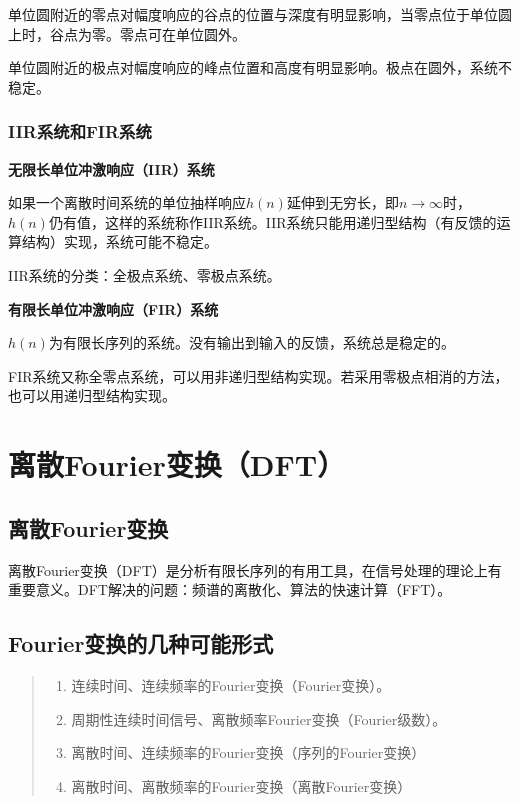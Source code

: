 \documentclass[cn, hazy, blue, normal, 12pt]{elegantnote}
\begin{document}
单位圆附近的零点对幅度响应的谷点的位置与深度有明显影响，当零点位于单位圆上时，谷点为零。零点可在单位圆外。

单位圆附近的极点对幅度响应的峰点位置和高度有明显影响。极点在圆外，系统不稳定。

\subsubsection{IIR系统和FIR系统}

\textbf{无限长单位冲激响应（IIR）系统}

如果一个离散时间系统的单位抽样响应$h(n)$延伸到无穷长，即$n\rightarrow\infty$时，$h(n)$仍有值，这样的系统称作IIR系统。IIR系统只能用递归型结构（有反馈的运算结构）实现，系统可能不稳定。

IIR系统的分类：全极点系统、零极点系统。

\textbf{有限长单位冲激响应（FIR）系统}

$h(n)$为有限长序列的系统。没有输出到输入的反馈，系统总是稳定的。

FIR系统又称全零点系统，可以用非递归型结构实现。若采用零极点相消的方法，也可以用递归型结构实现。

\section{离散Fourier变换（DFT）}

\subsection{离散Fourier变换}

离散Fourier变换（DFT）是分析有限长序列的有用工具，在信号处理的理论上有重要意义。DFT解决的问题：频谱的离散化、算法的快速计算（FFT）。

\subsection{Fourier变换的几种可能形式}

\begin{quote}
\begin{enumerate}
    \item 连续时间、连续频率的Fourier变换（Fourier变换）。
    \item 周期性连续时间信号、离散频率Fourier变换（Fourier级数）。
    \item 离散时间、连续频率的Fourier变换（序列的Fourier变换）
    \item 离散时间、离散频率的Fourier变换（离散Fourier变换）
\end{enumerate}
\end{quote}
\end{document}
